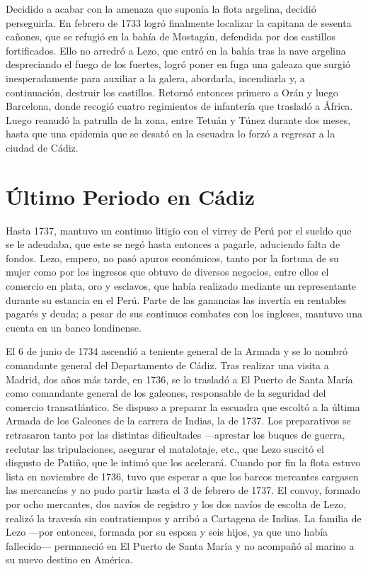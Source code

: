 Decidido a acabar con la amenaza que suponía la flota argelina,
decidió perseguirla. En febrero de 1733 logró finalmente localizar la
capitana de sesenta cañones, que se refugió en la bahía de Mostagán,
defendida por dos castillos fortificados. Ello no arredró a Lezo, que
entró en la bahía tras la nave argelina despreciando el fuego de los
fuertes, logró poner en fuga una galeaza que surgió inesperadamente
para auxiliar a la galera, abordarla, incendiarla y, a continuación,
destruir los castillos. Retornó entonces primero a Orán y luego
Barcelona, donde recogió cuatro regimientos de infantería que trasladó
a África. Luego reanudó la patrulla de la zona, entre Tetuán y Túnez
durante dos meses, hasta que una epidemia que se desató en la escuadra
lo forzó a regresar a la ciudad de Cádiz.

\section{Último Periodo en Cádiz}

Hasta 1737, mantuvo un continuo litigio con el virrey de Perú por el
sueldo que se le adeudaba, que este se negó hasta entonces a pagarle,
aduciendo falta de fondos. Lezo, empero, no pasó apuros económicos,
tanto por la fortuna de su mujer como por los ingresos que obtuvo de
diversos negocios, entre ellos el comercio en plata, oro y esclavos,
que había realizado mediante un representante durante su estancia en
el Perú. Parte de las ganancias las invertía en rentables pagarés y
deuda; a pesar de sus continuos combates con los ingleses, mantuvo una
cuenta en un banco londinense.

El 6 de junio de 1734 ascendió a teniente general de la Armada y se lo
nombró comandante general del Departamento de Cádiz. Tras realizar una
visita a Madrid, dos años más tarde, en 1736, se lo trasladó a El
Puerto de Santa María como comandante general de los galeones,
responsable de la seguridad del comercio transatlántico. Se dispuso a
preparar la escuadra que escoltó a la última Armada de los Galeones
 de
la carrera de Indias, la de 1737. Los preparativos se retrasaron tanto
por las distintas dificultades ---aprestar los buques de guerra,
reclutar las tripulaciones, asegurar el matalotaje, etc., que Lezo
suscitó el disgusto de Patiño, que le intimó que los acelerará.
Cuando por fin la flota estuvo lista en noviembre de 1736, tuvo que
esperar a que los barcos mercantes cargasen las mercancías y no pudo
partir hasta el 3 de febrero de 1737. El convoy, formado por ocho
mercantes, dos navíos de registro y los dos navíos de escolta de Lezo,
realizó la travesía sin contratiempos y arribó a Cartagena de
Indias. La familia de Lezo ---por entonces, formada por su esposa y
seis hijos, ya que uno había fallecido--- permaneció en El Puerto de
Santa María y no acompañó al marino a su nuevo destino en América.